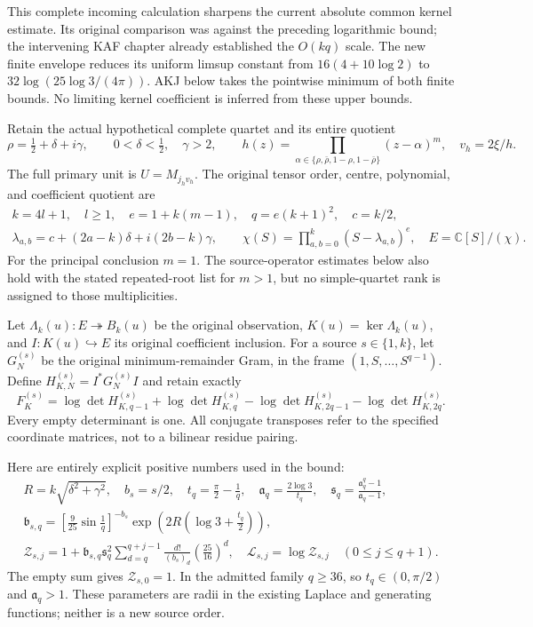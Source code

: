 This complete incoming calculation sharpens the current absolute common
kernel estimate. Its original comparison was against the preceding
logarithmic bound; the intervening KAF chapter already established
the $O(kq)$ scale. The new finite envelope reduces its uniform limsup
constant from $16(4+10\log2)$ to $32\log(25\log3/(4\pi))$.
AKJ below takes the pointwise minimum of both finite bounds. No
limiting kernel coefficient is inferred from these upper bounds.

Retain the actual hypothetical complete quartet and its entire quotient
\[
 \rho=\tfrac12+\delta+i\gamma,\qquad 0<\delta<\tfrac12,\quad \gamma>2,
 \qquad h(z)=\prod_{\alpha\in\{\rho,\bar\rho,1-\rho,1-\bar\rho\}}
 (z-\alpha)^m,\quad v_h=2\xi/h.
\]
The full primary unit is $U=M_{j_hv_h}$. The original tensor order, centre,
polynomial, and coefficient quotient are
\[
\begin{gathered}
 k=4l+1,\quad l\ge1,\quad e=1+k(m-1),\quad q=e(k+1)^2,\quad c=k/2,\\
 \lambda_{a,b}=c+(2a-k)\delta+i(2b-k)\gamma,\qquad
 \chi(S)=\prod_{a,b=0}^k(S-\lambda_{a,b})^e,
 \quad E=\mathbb C[S]/(\chi).
\end{gathered}\tag{AKS1}
\]
For the principal conclusion $m=1$. The source-operator estimates below
also hold with the stated repeated-root list for $m>1$, but no simple-quartet
rank is assigned to those multiplicities.

Let $\Lambda_k(u):E\twoheadrightarrow B_k(u)$ be the original observation,
$K(u)=\ker\Lambda_k(u)$, and $I:K(u)\hookrightarrow E$ its original
coefficient inclusion. For a source $s\in\{1,k\}$, let $G_N^{(s)}$ be the
original minimum-remainder Gram, in the frame $(1,S,\ldots,S^{q-1})$.
Define $H_{K,N}^{(s)}=I^*G_N^{(s)}I$ and retain exactly
\[
 F_K^{(s)}=
 \log\det H_{K,q-1}^{(s)}+\log\det H_{K,q}^{(s)}
 -\log\det H_{K,2q-1}^{(s)}-\log\det H_{K,2q}^{(s)}.
 \tag{AKS2}
\]
Every empty determinant is one. All conjugate transposes refer to the
specified coordinate matrices, not to a bilinear residue pairing.

Here are entirely explicit positive numbers used in the bound:
\[
\begin{gathered}
 R=k\sqrt{\delta^2+\gamma^2},\quad b_s=s/2,\quad
 t_q=\frac\pi2-\frac1q,\quad \mathfrak a_q=\frac{2\log3}{t_q},\quad
 \mathfrak s_q=\frac{\mathfrak a_q^q-1}{\mathfrak a_q-1},\\
 \mathfrak b_{s,q}=\left[\frac9{25}\sin\frac1q\right]^{-b_s}
       \exp\left(2R\left(\log3+\frac{t_q}{2}\right)\right),\\
 \mathcal Z_{s,j}=1+\mathfrak b_{s,q}\mathfrak s_q^2
        \sum_{d=q}^{q+j-1}\frac{d!}{(b_s)_d}
                          \left(\frac{25}{16}\right)^d,
 \quad \mathcal L_{s,j}=\log \mathcal Z_{s,j}\quad (0\le j\le q+1).
\end{gathered}\tag{AKS3}
\]
The empty sum gives $\mathcal Z_{s,0}=1$. In the admitted family $q\ge36$, so
$t_q\in(0,\pi/2)$ and $\mathfrak a_q>1$. These parameters are radii in the existing
Laplace and generating functions; neither is a new source order.

